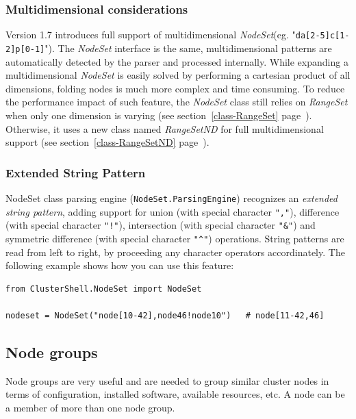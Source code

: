 \documentclass[english,a4paper]{csuserguide}
\newcommand{\NodeSet}{\textit{NodeSet}\xspace}
\newcommand{\RangeSet}{\textit{RangeSet}\xspace}
\newcommand{\RangeSetND}{\textit{RangeSetND}\xspace}
\begin{document}
\subsubsection{Multidimensional considerations}
\label{class-NodeSet-nD}

Version 1.7 introduces full support of multidimensional \NodeSet (eg. "\verb+da[2-5]c[1-2]p[0-1]+"). The \NodeSet interface is the same, multidimensional patterns are automatically detected by the parser and processed internally. While expanding a multidimensional \NodeSet is easily solved by performing a cartesian product of all dimensions, folding nodes is much more complex and time consuming. To reduce the performance impact of such feature, the \NodeSet class still relies on \RangeSet when only one dimension is varying (see section~\ref{class-RangeSet} page~\pageref{class-RangeSet}). Otherwise, it uses a new class named \RangeSetND for full multidimensional support (see section~\ref{class-RangeSetND} page~\pageref{class-RangeSetND}).

\subsubsection{Extended String Pattern}
\label{class-NodeSet-extended-patterns}

NodeSet class parsing engine (\lstinline+NodeSet.ParsingEngine+) recognizes an \textit{extended string pattern}, adding support for union (with special character \texttt{","}), difference (with special character \texttt{"!"}), intersection (with special character \texttt{"\&"}) and symmetric difference (with special character \verb+"^"+) operations. String patterns are read from left to right, by proceeding any character operators accordinately. The following example shows how you can use this feature:
\medskip
\begin{lstlisting}[breaklines=true, breakatwhitespace=true]
from ClusterShell.NodeSet import NodeSet

nodeset = NodeSet("node[10-42],node46!node10")   # node[11-42,46]
\end{lstlisting}

\pagebreak[4]

\subsection{Node groups}
\label{class-NodeSet-groups}

Node groups are very useful and are needed to group similar cluster nodes in terms of configuration, installed software, available resources, etc. A node can be a member of more than one node group.
\end{document}
